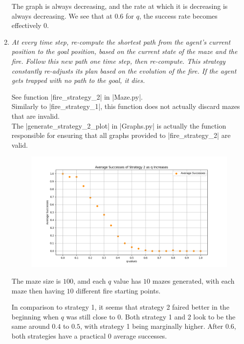 \documentclass[12pt, twoside]{article}
\begin{document}
\begin{enumerate}
        \vspace{4mm}
        The graph is always decreasing, and the rate at which it is decreasing is always decreasing. We see that at $0.6$ for $q$, the success rate becomes effectively $0$.

        \pagebreak
    
    \item
        \textit{At every time step, re-compute the shortest path from the agent’s current position to the goal position, based on  the  current  state  of  the  maze  and  the  fire.   Follow  this  new  path  one  time  step,  then  re-compute.   This strategy constantly re-adjusts its plan based on the evolution of the fire.  If the agent gets trapped with no path to the goal, it dies.}

        \vspace{4mm}
        See function \cverb|fire_strategy_2| in \cverb|Maze.py|. \\
        Similarly to \cverb|fire_strategy_1|, this function does not actually discard mazes that are invalid. \\
        The \cverb|generate_strategy_2_plot| in \cverb|Graphs.py| is actually the function responsible for ensuring that all graphs provided to \cverb|fire_strategy_2| are valid.

        \begin{figure}[h]
            \centering
            \includegraphics[scale = 0.6]{strategy_2_scatter.png}
        \end{figure}

        The maze size is $100$, amd each $q$ value has $10$ mazes generated, with each maze then having $10$ different fire starting points.

        In comparison to strategy 1, it seems that strategy 2 faired better in the beginning when $q$ was still close to $0$. Both strategy 1 and 2 look to be the same around $0.4$ to $0.5$, with strategy 1 being marginally higher. After $0.6$, both strategies have a practical $0$ average successes.


\end{enumerate}
\end{document}
